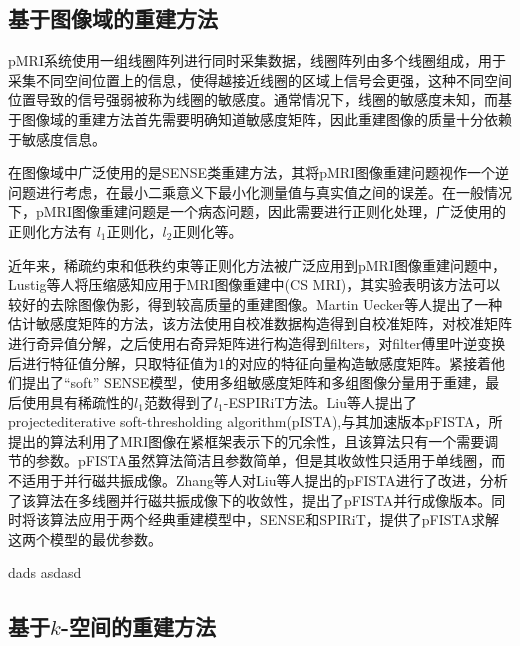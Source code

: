 \documentclass[11pt]{article}
\begin{document}
	\subsection{基于图像域的重建方法}
	\par pMRI系统使用一组线圈阵列进行同时采集数据，线圈阵列由多个线圈组成，用于采集不同空间位置上的信息，使得越接近线圈的区域上信号会更强，这种不同空间位置导致的信号强弱被称为线圈的敏感度。通常情况下，线圈的敏感度未知，而基于图像域的重建方法首先需要明确知道敏感度矩阵，因此重建图像的质量十分依赖于敏感度信息。
	\par 在图像域中广泛使用的是SENSE类重建方法，其将pMRI图像重建问题视作一个逆问题进行考虑，在最小二乘意义下最小化测量值与真实值之间的误差。在一般情况下，pMRI图像重建问题是一个病态问题，因此需要进行正则化处理，广泛使用的正则化方法有 $l_1$正则化，$l_2$正则化等。
	\par 近年来，稀疏约束和低秩约束等正则化方法被广泛应用到pMRI图像重建问题中，Lustig等人将压缩感知应用于MRI图像重建中(CS MRI)\cite{lustig2007sparse}，其实验表明该方法可以较好的去除图像伪影，得到较高质量的重建图像。Martin Uecker等人提出了一种估计敏感度矩阵的方法\cite{uecker2014espirit}，该方法使用自校准数据构造得到自校准矩阵，对校准矩阵进行奇异值分解，之后使用右奇异矩阵进行构造得到filters，对filter傅里叶逆变换后进行特征值分解，只取特征值为1的对应的特征向量构造敏感度矩阵。紧接着他们提出了“soft” SENSE模型，使用多组敏感度矩阵和多组图像分量用于重建，最后使用具有稀疏性的$l_1$范数得到了$l_1$-ESPIRiT方法。Liu等人提出了projectediterative soft-thresholding algorithm(pISTA),与其加速版本pFISTA\cite{7448403}，所提出的算法利用了MRI图像在紧框架表示下的冗余性，且该算法只有一个需要调节的参数。pFISTA虽然算法简洁且参数简单，但是其收敛性只适用于单线圈，而不适用于并行磁共振成像。Zhang等人对Liu等人提出的pFISTA进行了改进，分析了该算法在多线圈并行磁共振成像下的收敛性，提出了pFISTA并行成像版本\cite{ZHANG2021101987}。同时将该算法应用于两个经典重建模型中，SENSE\cite{pruessmann1999sense}和SPIRiT\cite{lustig2010spirit}，提供了pFISTA求解这两个模型的最优参数。
	\par dads\cite{8017620} asdasd \cite{8428648}
	
	
	
	\subsection{基于$k$-空间的重建方法} 
	
	\newpage
	
\end{document}
